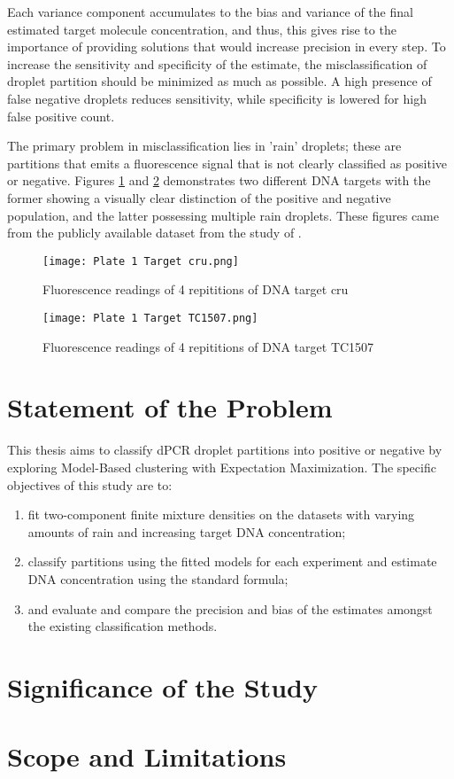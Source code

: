 Each variance component accumulates to the bias and variance of the final estimated target molecule concentration, and thus, this gives rise to the importance of providing solutions that would increase precision in every step. To increase the sensitivity and specificity of the estimate, the misclassification of droplet partition should be minimized as much as possible. A high presence of false negative droplets reduces sensitivity, while specificity is lowered for high false positive count. 

The primary problem in misclassification lies in 'rain' droplets; these are partitions that emits a fluorescence signal that is not clearly classified as positive or negative. Figures \ref{fig:plate1cru} and \ref{fig:plate1tc1507} demonstrates two different DNA targets with the former showing a visually clear distinction of the positive and negative population, and the latter possessing multiple rain droplets. These figures came from the publicly available dataset from the study of . 



\begin{figure}[h]
    \centering
    \texttt{[image: Plate 1 Target cru.png]}
    \caption{Fluorescence readings of 4 repititions of DNA target cru}
        \label{fig:plate1cru}
\end{figure}

\begin{figure}[h]
    \centering
    \texttt{[image: Plate 1 Target TC1507.png]}
    \caption{Fluorescence readings of 4 repititions of DNA target TC1507}
        \label{fig:plate1tc1507}
\end{figure}

\section{Statement of the Problem}
\label{sec:statementprob}

This thesis aims to classify dPCR droplet partitions into positive or negative by exploring Model-Based clustering with Expectation Maximization. The specific objectives of this study are to:
\begin{enumerate}
    \item fit two-component finite mixture densities on the datasets with varying amounts of rain and increasing target DNA concentration;
    \item classify partitions using the fitted models for each experiment and estimate DNA concentration using the standard formula;
    \item and evaluate and compare the precision and bias of the estimates amongst the existing classification methods. 
\end{enumerate}

\section{Significance of the Study}
\label{sec:significancestudy}



\section{Scope and Limitations}
\label{sec:significance}
